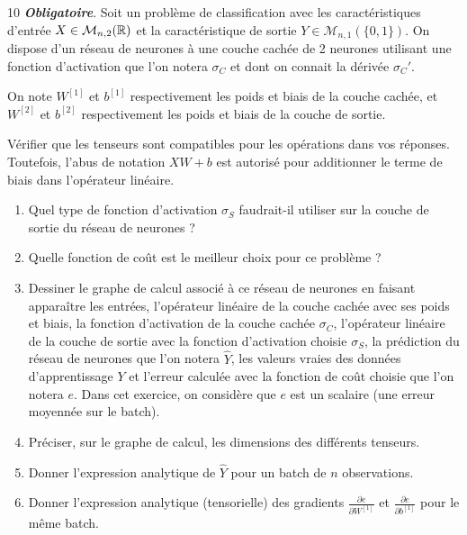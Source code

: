\documentclass[solutions]{../cc}
\begin{document}
		
	\begin{exopoints}{10}
		\textit{\textbf{Obligatoire}}. Soit un problème de classification avec les caractéristiques d'entrée \mbox{$X \in \mathcal{M}_{n,2}(\mathbb{R})$} et la caractéristique de sortie $Y \in \mathcal{M}_{n,1}(\{0, 1\})$. On dispose d'un réseau de neurones à une couche cachée de 2 neurones utilisant une fonction d'activation que l'on notera $\sigma_C$ et dont on connait la dérivée $\sigma_C'$.
				
		On note $W^{[1]}$ et $b^{[1]}$ respectivement les poids et biais de la couche cachée, et $W^{[2]}$ et $b^{[2]}$ respectivement les poids et biais de la couche de sortie.
		
		Vérifier que les tenseurs sont compatibles pour les opérations dans vos réponses. Toutefois, l'abus de notation  $X W + b$ est autorisé pour additionner le terme de biais dans l'opérateur linéaire.
		
		\begin{enumerate}
			\item Quel type de fonction d'activation $\sigma_S$ faudrait-il utiliser sur la couche de sortie du réseau de neurones ?
			\item Quelle fonction de coût est le meilleur choix pour ce problème ?
			\item Dessiner le graphe de calcul associé à ce réseau de neurones en faisant apparaître les entrées, l'opérateur linéaire de la couche cachée avec ses poids et biais, la fonction d'activation de la couche cachée $\sigma_C$, l'opérateur linéaire de la couche de sortie avec la fonction d'activation choisie $\sigma_S$, la prédiction du réseau de neurones que l'on notera $\hat{Y}$, les valeurs vraies des données d'apprentissage $Y$ et l'erreur calculée avec la fonction de coût choisie que l'on notera $e$. Dans cet exercice, on considère que $e$ est un scalaire (une erreur moyennée sur le batch).
			\item Préciser, sur le graphe de calcul, les dimensions des différents tenseurs.
			\item Donner l'expression analytique de $\hat{Y}$ pour un batch de $n$ observations.
			\item Donner l'expression analytique (tensorielle) des gradients $\frac{\partial{e}}{\partial{W^{[1]}}}$ et $\frac{\partial{e}}{\partial{b^{[1]}}}$ pour le même batch.		
		\end{enumerate}
	\end{exopoints}
		
\end{document}

